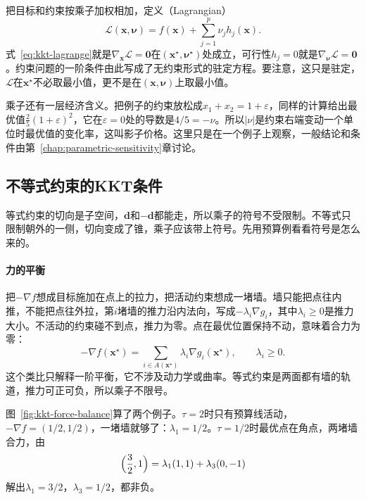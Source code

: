 把目标和约束按乘子加权相加，定义（Lagrangian）
\begin{equation}
 \mathcal{L}(\bm{x},\bm{\nu})=f(\bm{x})+\sum_{j=1}^p\nu_jh_j(\bm{x}).
 \label{eq:kkt-lagrangian-equality}
\end{equation}
式~\eqref{eq:kkt-lagrange}就是$\nabla_{\bm{x}}\mathcal{L}=\bm{0}$在$(\bm{x}^\star,\bm{\nu}^\star)$处成立，可行性$h_j=0$就是$\nabla_{\bm{\nu}}\mathcal{L}=\bm{0}$。约束问题的一阶条件由此写成了无约束形式的驻定方程。要注意，这只是驻定，$\mathcal{L}$在$\bm{x}^\star$不必取最小值，更不是在$(\bm{x},\bm{\nu})$上取最小值。

乘子还有一层经济含义。把例子的约束放松成$x_1+x_2=1+\varepsilon$，同样的计算给出最优值$\frac25(1+\varepsilon)^2$，它在$\varepsilon=0$处的导数是$4/5=-\nu$。所以$\lvert\nu\rvert$是约束右端变动一个单位时最优值的变化率，这叫影子价格。这里只是在一个例子上观察，一般结论和条件由第~\ref{chap:parametric-sensitivity}章讨论。

\subsection{不等式约束的KKT条件}
\label{sec:kkt-conditions}

等式约束的切向是子空间，$\bm{d}$和$-\bm{d}$都能走，所以乘子的符号不受限制。不等式只限制朝外的一侧，切向变成了锥，乘子应该带上符号。先用预算例看看符号是怎么来的。

\paragraph{力的平衡}
把$-\nabla f$想成目标施加在点上的拉力，把活动约束想成一堵墙。墙只能把点往内推，不能把点往外拉，第$i$堵墙的推力沿内法向，写成$-\lambda_i\nabla g_i$，其中$\lambda_i\geq0$是推力大小。不活动的约束碰不到点，推力为零。点在最优位置保持不动，意味着合力为零：
\begin{equation}
 -\nabla f(\bm{x}^\star)=\sum_{i\in A(\bm{x}^\star)}\lambda_i\nabla g_i(\bm{x}^\star),\qquad\lambda_i\geq0.
 \label{eq:kkt-force-balance}
\end{equation}
这个类比只解释一阶平衡，它不涉及动力学或曲率。等式约束是两面都有墙的轨道，推力可正可负，所以乘子不限号。

图~\ref{fig:kkt-force-balance}算了两个例子。$\tau=2$时只有预算线活动，$-\nabla f=(1/2,1/2)$，一堵墙就够了：$\lambda_1=1/2$。$\tau=1/2$时最优点在角点，两堵墙合力，由
\[
 \Bigl(\frac32,1\Bigr)=\lambda_1(1,1)+\lambda_3(0,-1)
\]
解出$\lambda_1=3/2$，$\lambda_3=1/2$，都非负。

